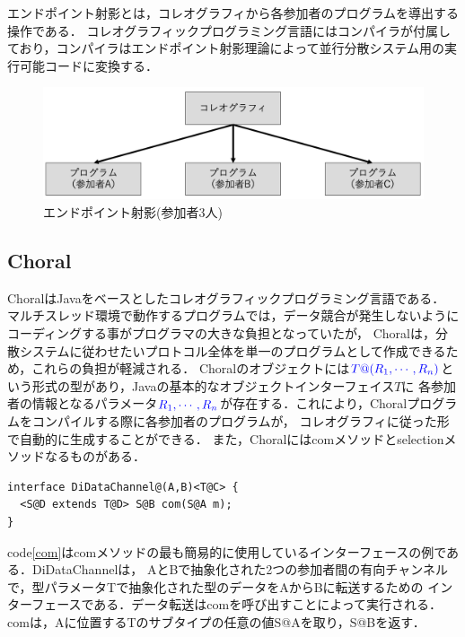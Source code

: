 \documentclass{thesis}
\begin{document}
エンドポイント射影とは，コレオグラフィから各参加者のプログラムを導出する操作である．
コレオグラフィックプログラミング言語にはコンパイラが付属しており，コンパイラはエンドポイント射影理論によって並行分散システム用の実行可能コードに変換する．

\begin{figure}[H]
  \centering
  \includegraphics[scale=0.5]{image/epp.png}
  \caption{エンドポイント射影(参加者3人)}
\end{figure}
\subsection{Choral}
Choral\cite{choral}はJavaをベースとしたコレオグラフィックプログラミング言語である．
マルチスレッド環境で動作するプログラムでは，データ競合が発生しないようにコーディングする事がプログラマの大きな負担となっていたが，
Choralは，分散システムに従わせたいプロトコル全体を単一のプログラムとして作成できるため，これらの負担が軽減される．
Choralのオブジェクトには${\color{blue}{T@(R_1,\cdots,R_n)}}$という形式の型があり，Javaの基本的なオブジェクトインターフェイス$T$に
各参加者の情報となるパラメータ${\color{blue}{R_1,\cdots,R_n}}$が存在する．これにより，Choralプログラムをコンパイルする際に各参加者のプログラムが，
コレオグラフィに従った形で自動的に生成することができる．
また，Choralにはcomメソッドとselectionメソッドなるものがある\cite{objective_Choreographies}．

\begin{lstlisting}[caption=データ転送のための基本的な有向チャンネル,label=com]
interface DiDataChannel@(A,B)<T@C> {
  <S@D extends T@D> S@B com(S@A m);
} 
\end{lstlisting}
code\ref{com}はcomメソッドの最も簡易的に使用しているインターフェースの例である．DiDataChannelは，
AとBで抽象化された2つの参加者間の有向チャンネルで，型パラメータTで抽象化された型のデータをAからBに転送するための
インターフェースである．データ転送はcomを呼び出すことによって実行される．comは，Aに位置するTのサブタイプの任意の値S@Aを取り，S@Bを返す．
\end{document}
